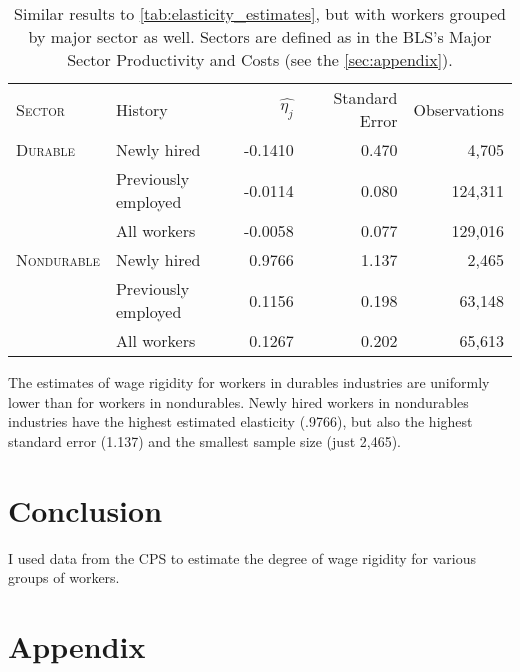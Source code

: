 \documentclass[11pt]{article}
\begin{document}
\begin{table}
    \centering
    \begin{tabular}{llrrr} \toprule
       \textsc{Sector}     & History              & $\hat{\eta_j}$ & Standard Error   & Observations\\
       \textsc{Durable}    & Newly hired          & -0.1410         & 0.470            & 4,705       \\
                  & Previously employed  & -0.0114         & 0.080            & 124,311     \\
                  & All workers          & -0.0058         & 0.077            & 129,016     \\
       \textsc{Nondurable} & Newly hired          & 0.9766          & 1.137            & 2,465       \\
                  & Previously employed  & 0.1156          & 0.198            & 63,148      \\
                  & All workers          & 0.1267          & 0.202            & 65,613      \\ \bottomrule
    \end{tabular}
    \caption{
                Similar results to \autoref{tab:elasticity_estimates}, but with workers grouped by major sector as well. Sectors are defined as in the BLS's Major Sector Productivity and Costs (see the \autoref{sec:appendix}).
            }
    \label{tab:elasticity_estimates_sector}
\end{table}

The estimates of wage rigidity for workers in durables industries are uniformly lower than for workers in nondurables.
Newly hired workers in nondurables industries have the highest estimated elasticity (.9766), but also the highest standard error (1.137) and the smallest sample size (just 2,465).

\section{Conclusion}

I used data from the CPS to estimate the degree of wage rigidity for various groups of workers.

\newpage



\appendix

\section{Appendix}
\label{sec:appendix}
\end{document}
